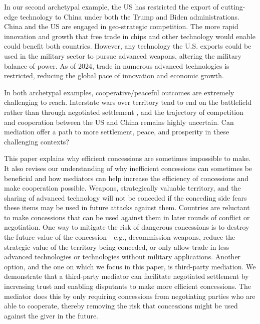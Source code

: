 \documentclass[bibtex,autowc]{apsr_submission}
\begin{document}
In our second archetypal example, the US has restricted the export of cutting-edge technology to China under both the Trump and Biden administrations. China and the US are engaged in geo-strategic competition. The more rapid innovation and growth that free trade in chips and other technology would enable could benefit both countries. However, any technology the U.S. exports could be used in the military sector to pursue advanced weapons, altering the military balance of power. As of 2024, trade in numerous advanced technologies is restricted, reducing the global pace of innovation and economic growth. 

In both archetypal examples, cooperative/peaceful outcomes are extremely challenging to reach. %
Interstate wars over territory tend to end on the battlefield rather than through negotiated settlement \citep{hensel1996}, and the trajectory of competition and cooperation between the US and China remains highly uncertain. Can mediation offer a path to more settlement, peace, and prosperity in these challenging contexts? 

This paper explains why efficient concessions are sometimes impossible to make. It also revises our understanding of why inefficient concessions can sometimes be beneficial and how mediators can help increase the efficiency of concessions and make cooperation possible. Weapons, strategically valuable territory, and the sharing of advanced technology will not be conceded if the conceding side fears these items may be used in future attacks against them. Countries are reluctant to make concessions that can be used against them in later rounds of conflict or negotiation. One way to mitigate the risk of dangerous concessions is to destroy the future value of the concession---e.g., decommission weapons, reduce the strategic value of the territory being conceded, or only allow trade in less advanced technologies or technologies without military applications. Another option, and the one on which we focus in this paper, is third-party mediation. We demonstrate that a third-party mediator can facilitate negotiated settlement by increasing trust and enabling disputants to make more efficient concessions. The mediator does this by only requiring concessions from negotiating parties who are able to cooperate, thereby removing the risk that concessions might be used against the giver in the future.
\end{document}
